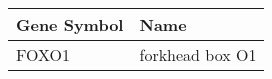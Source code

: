 \begin{tabular}{ll}
\toprule
Gene Symbol &            Name \\
\midrule
      FOXO1 & forkhead box O1 \\
\bottomrule
\end{tabular}
